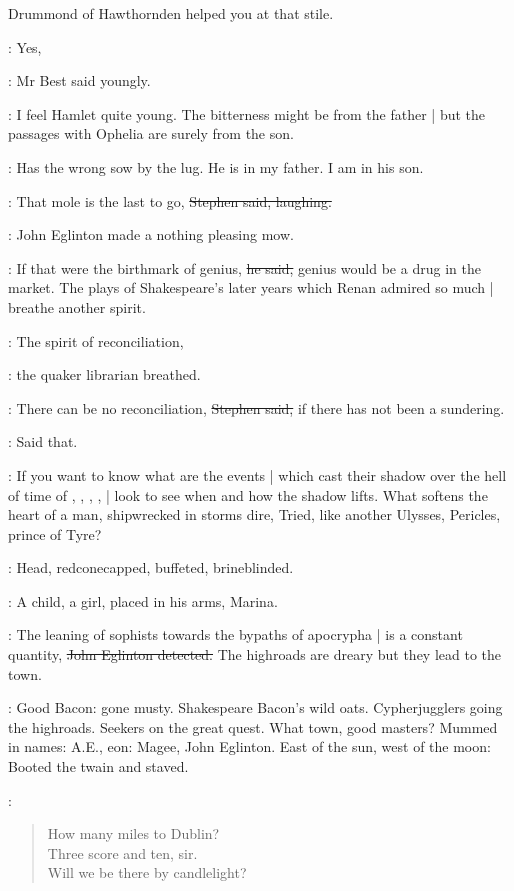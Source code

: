 Drummond of Hawthornden helped you at that stile.

\best:
Yes,

:
Mr Best said youngly.

\best:
I feel Hamlet quite young.
The bitterness might be from the father |
but the passages with Ophelia are surely from the son.

\StephenInt:
Has the wrong sow by the lug.
He is in my father.
I am in his son.

\Stephen:
That mole is the last to go,
\sout{Stephen said, laughing.}

:
John Eglinton made a nothing pleasing mow.

\eglinton:
If that were the birthmark of genius,
\sout{he said,}
genius would be a drug in the market.
The plays of Shakespeare's later years which Renan admired so much |
breathe another spirit.

\librarian:
The spirit of reconciliation,

:
the quaker librarian breathed.

\Stephen:
There can be no reconciliation,
\sout{Stephen said,}
if there has not been a sundering.

\StephenInt:
Said that.

\Stephen:
If you want to know what are the events |
which cast their shadow over the hell of time of
,
,
,
, |
look to see when and how the shadow lifts.
What softens the heart of a man,
shipwrecked in storms dire,
Tried,
like another Ulysses,
Pericles, prince of Tyre?

\StephenInt:
Head,
redconecapped,
buffeted,
brineblinded.

\Stephen:
A child, a girl,
placed in his arms,
Marina.

\eglinton:
The leaning of sophists towards the bypaths of apocrypha |
is a constant quantity,
\sout{John Eglinton detected.}
The highroads are dreary but they lead to the town.

\StephenInt:
Good Bacon:
gone musty.
Shakespeare Bacon's wild oats.
Cypherjugglers going the highroads.
Seekers on the great quest.
What town,
good masters?
Mummed in names:
A.E.,
eon:
Magee,
John Eglinton.
East of the sun,
west of the moon:
Booted the twain and staved.

\StephenInt:
\begin{verse}
    How many miles to Dublin? \\
    Three score and ten, sir. \\
    Will we be there by candlelight?
\end{verse}

